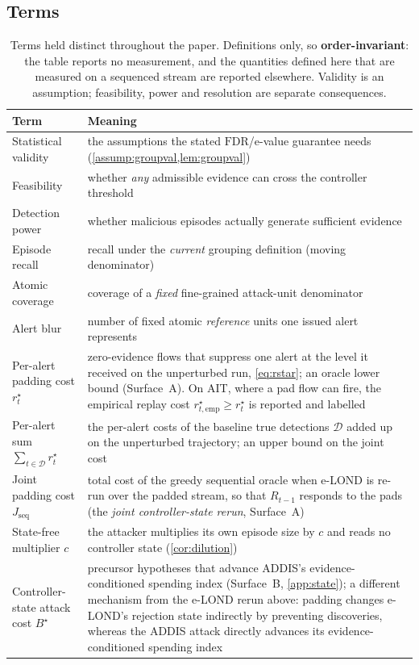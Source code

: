 \documentclass[conference]{IEEEtran}
\newcommand{\FDR}{\mathrm{FDR}}
\begin{document}
\subsection{Terms}

\begin{table}[t]
\centering
\caption{Terms held distinct throughout the paper. Definitions only, so \textbf{order-invariant}: the
table reports no measurement, and the quantities defined here that are measured on a sequenced stream are
reported elsewhere. Validity is an assumption; feasibility, power and resolution are separate
consequences.}
\label{tab:terms}
\footnotesize
\setlength{\tabcolsep}{4pt}
\begin{tabular}{@{}>{\raggedright\arraybackslash}p{2.45cm}>{\raggedright\arraybackslash}p{5.85cm}@{}}
\toprule
Term & Meaning \\
\midrule
Statistical validity & the assumptions the stated $\FDR$/e-value guarantee needs (\cref{assump:groupval,lem:groupval}) \\
Feasibility & whether \emph{any} admissible evidence can cross the controller threshold \\
Detection power & whether malicious episodes actually generate sufficient evidence \\
Episode recall & recall under the \emph{current} grouping definition (moving denominator) \\
Atomic coverage & coverage of a \emph{fixed} fine-grained attack-unit denominator \\
Alert blur & number of fixed atomic \emph{reference} units one issued alert represents \\
\midrule
Per-alert padding cost $r^{\star}_t$ & zero-evidence flows that suppress one alert at the level it received on the unperturbed run, \eqref{eq:rstar}; an oracle lower bound (Surface~A). On AIT, where a pad flow can fire, the empirical replay cost $r^{\star}_{t,\mathrm{emp}}\ge r^{\star}_t$ is reported and labelled \\
Per-alert sum $\sum_{t\in\mathcal D} r^{\star}_t$ & the per-alert costs of the baseline true detections $\mathcal D$ added up on the unperturbed trajectory; an upper bound on the joint cost \\
Joint padding cost $J_{\mathrm{seq}}$ & total cost of the greedy sequential oracle when e-LOND is re-run over the padded stream, so that $R_{t-1}$ responds to the pads (the \emph{joint controller-state rerun}, Surface~A) \\
State-free multiplier $c$ & the attacker multiplies its own episode size by $c$ and reads no controller state (\cref{cor:dilution}) \\
Controller-state attack cost $B^{\star}$ & precursor hypotheses that advance ADDIS's evidence-conditioned spending index (Surface~B, \cref{app:state}); a different mechanism from the e-LOND rerun above: padding changes e-LOND's rejection state indirectly by preventing discoveries, whereas the ADDIS attack directly advances its evidence-conditioned spending index \\
\bottomrule
\end{tabular}
\end{table}
\end{document}
